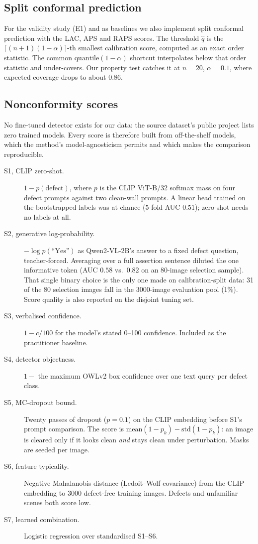 \subsection{Split conformal prediction}

For the validity study (E1) and as baselines we also implement split
conformal prediction with the LAC, APS and RAPS scores. The threshold
$\hat q$ is the $\lceil(n+1)(1-\alpha)\rceil$-th smallest calibration
score, computed as an exact order statistic. The common
$\mathrm{quantile}(1-\alpha)$ shortcut interpolates below that order
statistic and under-covers. Our property test catches it at
$n = 20$, $\alpha = 0.1$, where expected coverage drops to about $0.86$.

\subsection{Nonconformity scores}

No fine-tuned detector exists for our data: the source dataset's public
project lists zero trained models. Every score is therefore built from
off-the-shelf models, which the method's model-agnosticism permits and
which makes the comparison reproducible.
\begin{description}
  \item[S1, CLIP zero-shot.] $1 - p(\text{defect})$, where $p$ is the
  CLIP ViT-B/32 softmax mass on four defect prompts against two clean-wall
  prompts. A linear head trained on the bootstrapped labels was at chance
  (5-fold AUC $0.51$); zero-shot needs no labels at all.
  \item[S2, generative log-probability.] $-\log p(\text{``Yes''})$ as
  Qwen2-VL-2B's answer to a fixed defect question, teacher-forced.
  Averaging over a full assertion sentence diluted the one informative
  token (AUC $0.58$ vs.\ $0.82$ on an 80-image selection sample). That
  single binary choice is the only one made on calibration-split data:
  31 of the 80 selection images fall in the 3000-image evaluation pool
  (1\%). Score quality is also reported on the disjoint tuning set.
  \item[S3, verbalised confidence.] $1 - c/100$ for the model's stated
  0--100 confidence. Included as the practitioner baseline.
  \item[S4, detector objectness.] $1 - $ the maximum OWLv2 box confidence
  over one text query per defect class.
  \item[S5, MC-dropout bound.] Twenty passes of dropout ($p = 0.1$) on the
  CLIP embedding before S1's prompt comparison. The score is
  $\mathrm{mean}(1-p_k) - \mathrm{std}(1-p_k)$: an image is cleared only if
  it looks clean \emph{and} stays clean under perturbation. Masks are
  seeded per image.
  \item[S6, feature typicality.] Negative Mahalanobis distance (Ledoit--Wolf
  covariance) from the CLIP embedding to 3000 defect-free training images.
  Defects and unfamiliar scenes both score low.
  \item[S7, learned combination.] Logistic regression over standardised
  S1--S6.
\end{description}

